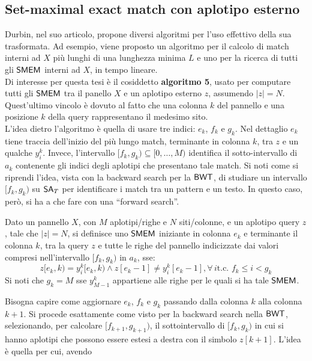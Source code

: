 \subsection{Set-maximal exact match con aplotipo esterno}
Durbin, nel suo articolo, propone diversi algoritmi per l'uso effettivo della
sua trasformata. Ad esempio, viene proposto un algoritmo per il calcolo
di match interni ad $X$ più lunghi di una lunghezza minima $L$ e uno per la
ricerca di tutti gli $\mbox{\rm {\sf SMEM}}$ interni ad $X$, in tempo lineare.\\
Di interesse per questa tesi è il cosiddetto \textbf{algoritmo 5}, usato
per computare tutti gli $\mbox{\rm {\sf SMEM}}$  tra il panello $X$ e un
aplotipo esterno $z$, assumendo $|z|=N$. Quest'ultimo vincolo è dovuto al fatto
che una colonna $k$ del
pannello e una posizione $k$ della query rappresentano il medesimo sito.\\ 
L'idea dietro l'algoritmo è quella di usare tre indici: $e_k$, $f_k$ e
$g_k$. Nel dettaglio $e_k$ tiene traccia dell'inizio del più lungo match,
terminante in colonna $k$, tra $z$ e un qualche $y_i^k$. Invece, l'intervallo
$[f_k,g_k)\subseteq[0,\ldots,M)$ identifica il sotto-intervallo di
$a_k$ contenente gli indici degli aplotipi che presentano tale match. Si noti
come si riprendi l'idea, vista con la backward search per la
$\mbox{\rm {\sf BWT}}$, di studiare un intervallo $[f_k,g_k)$ su $\mbox{\rm {\sf SA}}_T$ per identificare i
match tra un pattern e un testo. In questo caso, però, si ha a che fare con una
``forward search''.
\begin{definizione}
  Dato un pannello $X$, con $M$ aplotipi/righe e $N$ siti/colonne, e un aplotipo
  query $z$, tale che $|z|=N$, si definisce uno $\mbox{\rm {\sf SMEM}}$ iniziante in colonna
  $e_k$ e terminante il colonna 
  $k$, tra 
  la query $z$ e tutte le righe del pannello indicizzate dai valori compresi
  nell'intervallo $[f_k,g_k)$ in $a_k$, sse:
  \begin{equation}
    \label{eq:pbwtsmem}
    z[e_k,k)=y_i^k[e_k,k)\land z[e_k-1]\neq y_i^k[e_k-1], \forall\, i\mbox{
      t.c. }f_k\leq i < g_k
  \end{equation}
  Si noti che $g_k=M$ sse $y_{M-1}^k$ appartiene alle righe per le quali si ha
  tale $\mbox{\rm {\sf SMEM}}$.
\end{definizione}
Bisogna capire come aggiornare $e_k$, $f_k$ e $g_k$ passando dalla
colonna $k$ alla colonna $k+1$. Si procede esattamente come visto per la
backward search nella $\mbox{\rm {\sf BWT}}$, selezionando, per calcolare $[f_{k+1},g_{k+1})$, il
sottointervallo di $[f_k,g_k)$ in cui si hanno aplotipi che possono essere estesi
a destra con il simbolo $z[k+1]$. L'idea è quella per cui, avendo
